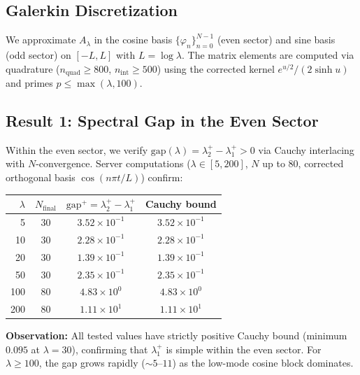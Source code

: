 \documentclass[12pt,a4paper]{article}
\theoremstyle{definition}
\theoremstyle{remark}
\begin{document}
\subsection{Galerkin Discretization}

We approximate $A_\lambda$ in the cosine basis $\{\varphi_n\}_{n=0}^{N-1}$ (even sector) and sine basis (odd sector) on $[-L,L]$ with $L = \log\lambda$. The matrix elements are computed via quadrature ($n_{\mathrm{quad}} \geq 800$, $n_{\mathrm{int}} \geq 500$) using the corrected kernel $e^{u/2}/(2\sinh u)$ and primes $p \leq \max(\lambda, 100)$.

\subsection{Result 1: Spectral Gap in the Even Sector}

Within the even sector, we verify $\mathrm{gap}(\lambda) = \lambda_2^+ - \lambda_1^+ > 0$ via Cauchy interlacing with $N$-convergence. Server computations ($\lambda \in [5,200]$, $N$ up to 80, corrected orthogonal basis $\cos(n\pi t/L)$) confirm:

\medskip
\begin{center}
\renewcommand{\arraystretch}{1.2}
\begin{tabular}{r|c|c|c}
$\lambda$ & $N_{\mathrm{final}}$ & $\mathrm{gap}^+ = \lambda_2^+ - \lambda_1^+$ & Cauchy bound \\\hline
5 & 30 & $3.52\times 10^{-1}$ & $3.52\times 10^{-1}$ \\
10 & 30 & $2.28\times 10^{-1}$ & $2.28\times 10^{-1}$ \\
20 & 30 & $1.39\times 10^{-1}$ & $1.39\times 10^{-1}$ \\
50 & 30 & $2.35\times 10^{-1}$ & $2.35\times 10^{-1}$ \\
100 & 80 & $4.83\times 10^{0}$ & $4.83\times 10^{0}$ \\
200 & 80 & $1.11\times 10^{1}$ & $1.11\times 10^{1}$ \\
\end{tabular}
\end{center}

\medskip\noindent
\textbf{Observation:} All tested values have strictly positive Cauchy bound (minimum $0.095$ at $\lambda=30$), confirming that $\lambda_1^+$ is simple within the even sector. For $\lambda \geq 100$, the gap grows rapidly ($\sim 5$--$11$) as the low-mode cosine block dominates.
\end{document}

